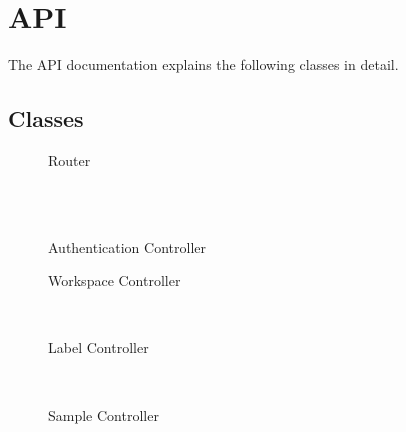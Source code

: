 \section{API}
The API documentation explains the following classes in detail.
\subsection{Classes}
\begin{figure}[hb]
    \centering
    \caption{Router}
    \label{fig:router-class}
\end{figure}
~\\
~\\
\begin{figure}[!htb]
    \centering
    \caption{Authentication Controller}
    \label{fig:auth-controller}
\end{figure}
\newpage
\begin{figure}[!htb]
    \centering
    \caption{Workspace Controller}
    \label{fig:workspace-controller}
\end{figure}
~\\
\begin{figure}[!htb]
    \centering
    \caption{Label Controller}
    \label{fig:label-controller}
\end{figure}
~\\
\begin{figure}[!htb]
    \centering
    \caption{Sample Controller}
    \label{fig:sample-controller}
\end{figure}
%
%
